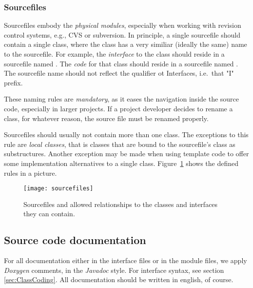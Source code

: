 \subsubsection{Sourcefiles}
Sourcefiles embody the \emph{physical modules}, especially when working with revision control systems, e.g., CVS or subversion.
In principle, a single sourcefile should contain a single class, where the class has a very similiar (ideally the same) name to the sourcefile. 
For example, the \emph{interface} to the class  should reside in a sourcefile named .
The \emph{code} for that class should reside in a sourcefile named .
The sourcefile name should not reflect the qualifier ot Interfaces, i.e.\ that "I" prefix.

These naming rules are \emph{mandatory}, as it eases the navigation inside the source code, especially in larger projects.
If a project developer decides to rename a class, for whatever reason, the source file must be renamed properly.

Sourcefiles should usually not contain more than one class.
The exceptions to this rule are \emph{local classes}, that is classes that are bound to the sourcefile's class as substructures.
Another exception may be made when using template code to offer some implementation alternatives to a single class.
Figure~\ref{fig:sourcefiles} shows the defined rules in a picture.
\begin{figure}
\begin{center}
\texttt{[image: sourcefiles]}
\end{center}
\caption{\label{fig:sourcefiles}
        Sourcefiles and allowed relationships to the classes and interfaces they can contain.}
\end{figure}


\subsection{Source code documentation}
For all documentation either in the interface files or in the module files, we apply \emph{Doxygen} comments, in the \emph{Javadoc} style.
For interface syntax, see section \ref{sec:ClassCoding}.
All documentation should be written in english, of course.

